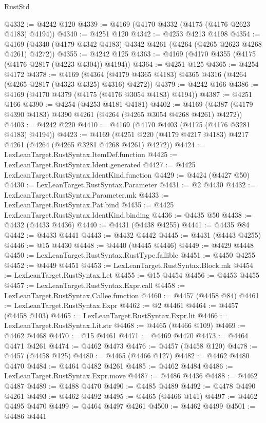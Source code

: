 \begin{lexlean}{RustStd}
\begin{coremodule}
@4332 := @4242 @120
@4339 := @4169 (@4170 @4332 (@4175 (@4176 @2623 @4183) @4194))
@4340 := @4251 @120
@4342 := @4253 @4213 @4198
@4354 := @4169 (@4340 (@4179 @4342 @4183) @4342 @4261 (@4264 (@4265 @2623 @4268 @4261) @4272))
@4355 := @4242 @125
@4363 := @4169 (@4170 @4355 (@4175 (@4176 @2817 (@4223 @4304)) @4194))
@4364 := @4251 @125
@4365 := @4254 @4172
@4378 := @4169
    (@4364 (@4179 @4365 @4183) @4365 @4316 (@4264 (@4265 @2817 (@4323 @4325) @4316) @4272))
@4379 := @4242 @166
@4386 := @4169 (@4170 @4379 (@4175 (@4176 @3054 @4183) @4194))
@4387 := @4251 @166
@4390 := @4254 (@4253 @4181 @4181)
@4402 := @4169 (@4387 (@4179 @4390 @4183) @4390 @4261 (@4264 (@4265 @3054 @4268 @4261) @4272))
@4403 := @4242 @220
@4410 := @4169 (@4170 @4403 (@4175 (@4176 @3281 @4183) @4194))
@4423 := @4169 (@4251 @220 (@4179 @4217 @4183) @4217 @4261 (@4264 (@4265 @3281 @4268 @4261) @4272))
@4424 := LexLeanTarget.RustSyntax.ItemDef.function
@4425 := LexLeanTarget.RustSyntax.Ident.generated
@4427 := @4425 LexLeanTarget.RustSyntax.IdentKind.function
@4429 := @4424 (@4427 @50)
@4430 := LexLeanTarget.RustSyntax.Parameter
@4431 := @2 @4430
@4432 := LexLeanTarget.RustSyntax.Parameter.mk
@4433 := LexLeanTarget.RustSyntax.Pat.bind
@4435 := @4425 LexLeanTarget.RustSyntax.IdentKind.binding
@4436 := @4435 @50
@4438 := @4432 (@4433 @4436)
@4440 := @4431 (@4438 @4255)
@4441 := @4435 @84
@4442 := @4433 @4441
@4443 := @4432 @4442
@4445 := @4431 (@4443 @4255)
@4446 := @15 @4430
@4448 := @4440 (@4445 @4446)
@4449 := @4429 @4448
@4450 := LexLeanTarget.RustSyntax.RustType.fallible
@4451 := @4450 @4255
@4452 := @4449 @4451
@4453 := LexLeanTarget.RustSyntax.Block.mk
@4454 := LexLeanTarget.RustSyntax.Let
@4455 := @15 @4454
@4456 := @4453 @4455
@4457 := LexLeanTarget.RustSyntax.Expr.call
@4458 := LexLeanTarget.RustSyntax.Callee.function
@4460 := @4457 (@4458 @84)
@4461 := LexLeanTarget.RustSyntax.Expr
@4462 := @2 @4461
@4464 := @4457 (@4458 @103)
@4465 := LexLeanTarget.RustSyntax.Expr.lit
@4466 := LexLeanTarget.RustSyntax.Lit.str
@4468 := @4465 (@4466 @109)
@4469 := @4462 @4468
@4470 := @15 @4461
@4471 := @4469 @4470
@4473 := @4464 @4471 @4261
@4474 := @4462 @4473
@4476 := @4457 (@4458 @120)
@4478 := @4457 (@4458 @125)
@4480 := @4465 (@4466 @127)
@4482 := @4462 @4480 @4470
@4484 := @4464 @4482 @4261
@4485 := @4462 @4484
@4486 := LexLeanTarget.RustSyntax.Expr.move
@4487 := @4486 @4436
@4488 := @4462 @4487
@4489 := @4488 @4470
@4490 := @4485 @4489
@4492 := @4478 @4490 @4261
@4493 := @4462 @4492
@4495 := @4465 (@4466 @141)
@4497 := @4462 @4495 @4470
@4499 := @4464 @4497 @4261
@4500 := @4462 @4499
@4501 := @4486 @4441

\end{coremodule}
\end{lexlean}
